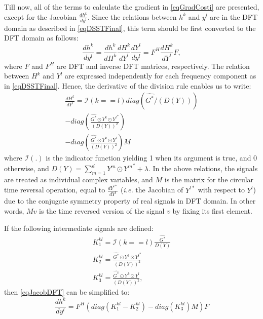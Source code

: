 \documentclass[journal]{IEEEtran}
\begin{document}
Till now, all of the terms to calculate the gradient in \eqref{eqGradCosti} are presented, except for the Jacobian $\frac{dh^k}{dy^l}$. Since the relations between $h^k$ and $y^l$ are in the DFT domain as described in \eqref{eqDSSTFinal}, this term should be first converted to the DFT domain as follows:
\begin{equation}
\label{eqJacobDFT}
\frac{dh^k}{dy^l} = \frac{dh^k}{dH^k} \frac{dH^k}{dY^l} \frac{dY^l}{dy^l} = F^H \frac{dH^k}{dY^l} F,
\end{equation}
where $F$ and $F^H$ are DFT and inverse DFT matrices, respectively. The relation between $H^k$ and $Y^l$ are expressed independently for each frequency component as in \eqref{eqDSSTFinal}. Hence, the derivative of the division rule enables us to write:
\footnotesize
\begin{equation}
\label{eqKYJac}
\begin{split}
\frac{d H^k}{d Y^l}= \mathcal{I}(k==l) diag\left(\hat{G^*}/\left(D(Y)\right)\right) \\ -diag\left(\frac{\hat{G^*} \odot Y^k \odot {Y^l}^*}{(D(Y))^2}\right)\\ -diag\left(\frac{\hat{G^*} \odot Y^k \odot Y^l}{(D(Y))^2}\right) M
\end{split}
\end{equation}
\normalsize
where $\mathcal{I}(.)$ is the indicator function yielding 1 when its argument is true, and 0 otherwise, and $D(Y)={\sum\limits_{m=1}^d Y^m \odot {Y^m}^*+\lambda}$. In the above relations, the signals are treated as individual complex variables, and $M$ is the matrix for the circular time reversal operation, equal to $\frac{d Y^{l*}}{d Y^l}$ (\emph{i.e.} the Jacobian of $Y^{l*}$ with respect to $Y^l$) due to the conjugate symmetry property of real signals in DFT domain. In other words, $Mv$ is the time reversed version of the signal $v$ by fixing its first element.

If the following intermediate signals are defined:
\begin{equation}
\label{eqIntermed}
\begin{split}
K_1^{kl}=\mathcal{I}(k==l) \frac{\hat{G^*}}{D(Y)}\\ K_2^{kl}=\frac{\hat{G^*} \odot Y^k \odot {Y^l}^*}{(D(Y))^2} \\ K_3^{kl}=\frac{\hat{G^*} \odot Y^k \odot Y^l}{(D(Y))^2},
\end{split}
\end{equation}
then \eqref{eqJacobDFT} can be simplified to:
\begin{equation}
\label{eqKYJacSimplified}
\frac{d h^k}{d y^l} = F^H(diag(K_1^{kl}-K_2^{kl})-diag(K_3^{kl})M)F
\end{equation}
\end{document}
